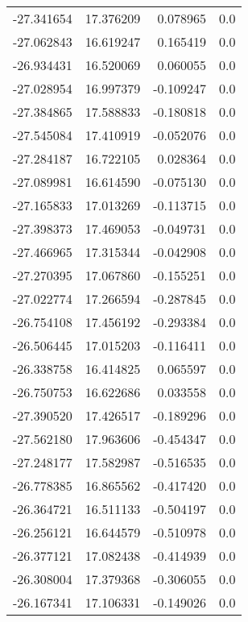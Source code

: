 \begin{tabular}{rrrr}
      -27.341654 &        17.376209 &    0.078965 &   0.0 \\
      -27.062843 &        16.619247 &    0.165419 &   0.0 \\
      -26.934431 &        16.520069 &    0.060055 &   0.0 \\
      -27.028954 &        16.997379 &   -0.109247 &   0.0 \\
      -27.384865 &        17.588833 &   -0.180818 &   0.0 \\
      -27.545084 &        17.410919 &   -0.052076 &   0.0 \\
      -27.284187 &        16.722105 &    0.028364 &   0.0 \\
      -27.089981 &        16.614590 &   -0.075130 &   0.0 \\
      -27.165833 &        17.013269 &   -0.113715 &   0.0 \\
      -27.398373 &        17.469053 &   -0.049731 &   0.0 \\
      -27.466965 &        17.315344 &   -0.042908 &   0.0 \\
      -27.270395 &        17.067860 &   -0.155251 &   0.0 \\
      -27.022774 &        17.266594 &   -0.287845 &   0.0 \\
      -26.754108 &        17.456192 &   -0.293384 &   0.0 \\
      -26.506445 &        17.015203 &   -0.116411 &   0.0 \\
      -26.338758 &        16.414825 &    0.065597 &   0.0 \\
      -26.750753 &        16.622686 &    0.033558 &   0.0 \\
      -27.390520 &        17.426517 &   -0.189296 &   0.0 \\
      -27.562180 &        17.963606 &   -0.454347 &   0.0 \\
      -27.248177 &        17.582987 &   -0.516535 &   0.0 \\
      -26.778385 &        16.865562 &   -0.417420 &   0.0 \\
      -26.364721 &        16.511133 &   -0.504197 &   0.0 \\
      -26.256121 &        16.644579 &   -0.510978 &   0.0 \\
      -26.377121 &        17.082438 &   -0.414939 &   0.0 \\
      -26.308004 &        17.379368 &   -0.306055 &   0.0 \\
      -26.167341 &        17.106331 &   -0.149026 &   0.0 \\

\end{tabular}
